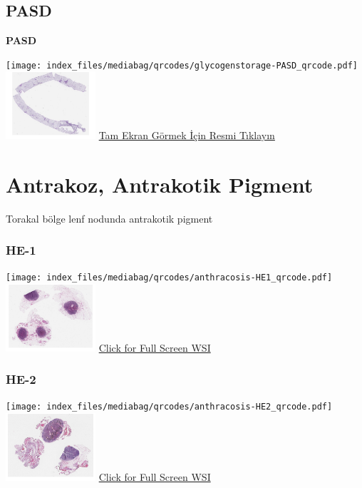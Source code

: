 \documentclass[
  letterpaper,
  DIV=11,
  numbers=noendperiod]{scrreprt}
\begin{document}
\subsection{PASD}\label{pasd}

\textbf{PASD}

\texttt{[image: index\_files/mediabag/qrcodes/glycogenstorage-PASD\_qrcode.pdf]}
\href{https://images.patolojiatlasi.com/glycogenstorage/PASD.html}{\includegraphics[width=0.25\textwidth,height=\textheight]{./screenshots/thumbnail_glycogenstorage-PASD.png}}
\href{https://images.patolojiatlasi.com/glycogenstorage/PASD.html}{Tam
Ekran Görmek İçin Resmi Tıklayın}

\section{Antrakoz, Antrakotik
Pigment}\label{sec-antrakoz-antrakotik-pigment}

Torakal bölge lenf nodunda antrakotik pigment

\subsubsection{HE-1}\label{he-1}

\texttt{[image: index\_files/mediabag/qrcodes/anthracosis-HE1\_qrcode.pdf]}
\href{https://images.patolojiatlasi.com/anthracosis/HE.html}{\includegraphics[width=0.25\textwidth,height=\textheight]{./screenshots/thumbnail_anthracosis1.png}}
\href{https://images.patolojiatlasi.com/anthracosis/HE.html}{Click for
Full Screen WSI}

\subsubsection{HE-2}\label{he-2}

\texttt{[image: index\_files/mediabag/qrcodes/anthracosis-HE2\_qrcode.pdf]}
\href{https://images.patolojiatlasi.com/anthracosis/HE2.html}{\includegraphics[width=0.25\textwidth,height=\textheight]{./screenshots/thumbnail_anthracosis2.png}}
\href{https://images.patolojiatlasi.com/anthracosis/HE2.html}{Click for
Full Screen WSI}
\end{document}
